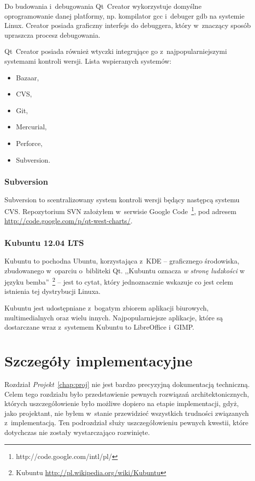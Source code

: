 Do budowania i~debugowania Qt~Creator wykorzystuje domyślne oprogramowanie danej platformy, np. kompilator gcc i~debuger gdb na systemie Linux. Creator posiada graficzny interfejs do debuggera, który w~znaczący sposób upraszcza procesz debugowania.

Qt~Creator posiada również wtyczki integrujące go z~najpopularniejszymi systemami kontroli wersji. Lista wspieranych systemów:
\begin{itemize}
\item{Bazaar,}
\item{CVS,}
\item{Git,}
\item{Mercurial,}
\item{Perforce,}
\item{Subversion.}
\end{itemize}

\subsubsection{Subversion}
Subversion to scentralizowany system kontroli wersji będący następcą systemu CVS. Repozytorium SVN założyłem w~serwisie Google Code~\footnote{http://code.google.com/intl/pl/}, pod adresem \url{http://code.google.com/p/qt-west-charts/}.

\subsubsection{Kubuntu 12.04 LTS}
Kubuntu to pochodna Ubuntu, korzystająca z~KDE -- graficznego środowiska, zbudowanego w~oparciu o~bibliteki Qt. ,,Kubuntu oznacza \textit{w stronę ludzkości} w języku bemba''~\footnote{Kubuntu \url{http://pl.wikipedia.org/wiki/Kubuntu}} -- jest to cytat, który jednoznacznie wskazuje co jest celem istnienia tej dystrybucji Linuxa.

Kubuntu jest udostępniane z~bogatym zbiorem aplikacji biurowych, multimedialnych oraz wielu innych. Najpopularniejsze aplikacje, które są dostarczane wraz z~systemem Kubuntu to LibreOffice i~GIMP. 


\section{Szczegóły implementacyjne}
Rozdział \textit{Projekt}~\ref{chap:proj} nie jest bardzo precyzyjną dokumentacją techniczną. Celem tego rozdziału było przedstawienie pewnych rozwiązań architektonicznych, których uszczegółowienie było możliwe dopiero na etapie implementacji, gdyż, jako projektant, nie byłem w~stanie przewidzieć wszystkich trudności związanych z~implementacją. Ten podrozdział służy uszczegółowieniu pewnych kwestii, które dotychczas nie zostały wystarczająco rozwinięte.

